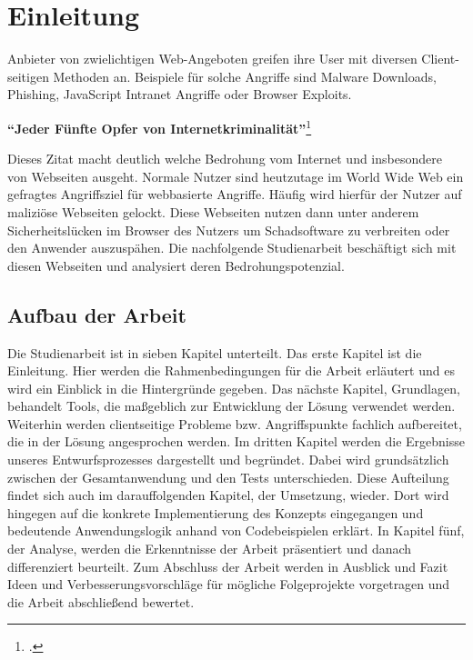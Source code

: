 \chapter{Einleitung}

Anbieter von zwielichtigen Web-Angeboten greifen ihre User mit diversen Client-seitigen Methoden an. Beispiele für solche Angriffe sind Malware Downloads, Phishing, JavaScript Intranet Angriffe oder Browser Exploits.

\begin{center}
\textbf{\enquote{Jeder Fünfte Opfer von Internetkriminalität}}\footcite[Zitat][297]{cybercrime}
\end{center}

Dieses Zitat macht deutlich welche Bedrohung vom Internet und insbesondere von Webseiten ausgeht. Normale Nutzer sind heutzutage im World Wide Web ein gefragtes Angriffsziel für webbasierte Angriffe. Häufig wird hierfür der Nutzer auf maliziöse Webseiten gelockt. Diese Webseiten nutzen dann unter anderem Sicherheitslücken im Browser des Nutzers um Schadsoftware zu verbreiten oder den Anwender auszuspähen. Die nachfolgende Studienarbeit beschäftigt sich mit diesen Webseiten und analysiert deren Bedrohungspotenzial.

\section{Aufbau der Arbeit}

Die Studienarbeit ist in sieben Kapitel unterteilt. Das erste Kapitel ist die Einleitung.
Hier werden die Rahmenbedingungen für die Arbeit erläutert und es wird ein Einblick in die
Hintergründe gegeben. Das nächste Kapitel, Grundlagen, behandelt Tools, die maßgeblich zur
Entwicklung der Lösung verwendet werden. Weiterhin werden clientseitige Probleme bzw. Angriffspunkte
fachlich aufbereitet, die in der Lösung angesprochen werden. Im dritten Kapitel
werden die Ergebnisse unseres Entwurfsprozesses dargestellt und begründet. Dabei wird grundsätzlich
zwischen der Gesamtanwendung und den Tests unterschieden. Diese Aufteilung findet sich auch im
darauffolgenden Kapitel, der Umsetzung, wieder. Dort wird hingegen auf die konkrete
Implementierung des Konzepts eingegangen und bedeutende Anwendungslogik anhand von Codebeispielen
erklärt. In Kapitel fünf, der Analyse, werden die Erkenntnisse der Arbeit präsentiert und danach
differenziert beurteilt. Zum Abschluss der Arbeit werden in Ausblick und Fazit Ideen und
Verbesserungsvorschläge für mögliche Folgeprojekte vorgetragen und die Arbeit abschließend
bewertet.

